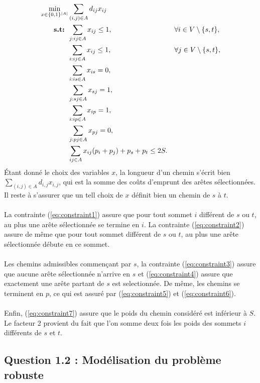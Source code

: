 \documentclass{article}
\begin{document}
\begin{align}
    \min_{x \in \{0,1\}^{|A|}} & \sum_{(i,j) \in A} d_{ij} x_{ij} && \notag \\
    \textbf{s.t: }  &\sum_{j: ij \in A} x_{ij} \leq 1, && \forall i \in V \setminus{\{s,t\}}, \label{eq:constraint1} \\
    &\sum_{i: ij \in A} x_{ij} \leq 1, && \forall j \in V \setminus{\{s,t\}}, \label{eq:constraint2} \\
    &\sum_{i: is \in A} x_{is} = 0, \label{eq:constraint3} \\
    &\sum_{j: sj \in A} x_{sj} = 1, \label{eq:constraint4} \\
    &\sum_{i: ip \in A} x_{ip} = 1, \label{eq:constraint5} \\
    &\sum_{j: pj \in A} x_{pj} = 0, \label{eq:constraint6} \\
    &\sum_{ij \in A} x_{ij}(p_i + p_j) + p_s + p_t \leq 2S. \label{eq:constraint7}
\end{align}
Étant donné le choix des variables $x$, la longueur d'un chemin s'écrit bien $\sum_{(i,j) \in A} d_{i,j} x_{i,j}$, qui est la somme des coûts d'emprunt des arêtes sélectionnées. Il reste à s'assurer que un tell choix de $x$ définit bien un chemin de $s$ à $t$.
\\
\\
La contrainte (\ref{eq:constraint1}) assure que pour tout sommet $i$ différent de $s$ ou $t$, au plus une arête sélectionnée se termine en $i$. La contrainte (\ref{eq:constraint2}) assure de même que pour tout sommet différent de $s$ ou $t$, au plus une arête sélectionnée débute en ce sommet.
\\
\\
Les chemins admissibles commençant par $s$, la contrainte (\ref{eq:constraint3}) assure que aucune arête sélectionnée n'arrive en $s$ et (\ref{eq:constraint4}) assure que exactement une arête partant de $s$ est selectionnée. De même, les chemins se terminent en $p$, ce qui est assuré par (\ref{eq:constraint5}) et (\ref{eq:constraint6}).
\\
\\
Enfin, (\ref{eq:constraint7}) assure que le poids du chemin considéré est inférieur à $S$. Le facteur 2 provient du fait que l'on somme deux fois les poids des sommets $i$ différents de $s$ et $t$.

\subsection{Question 1.2 : Modélisation du problème robuste}
\end{document}
